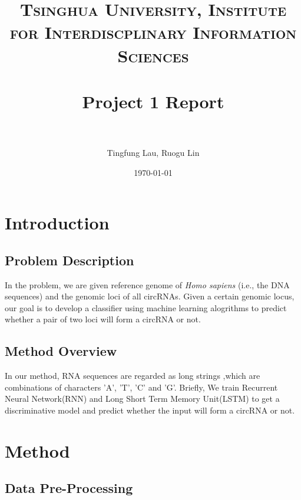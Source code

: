 \documentclass[paper=a4, fontsize=11pt] {scrartcl} %
\title{	
\normalfont \normalsize 
\textsc{Tsinghua University, Institute for Interdiscplinary Information Sciences} \\ [25pt] %
\horrule{0.5pt} \\[0.4cm] %
\huge Project 1 Report \\ %
\horrule{2pt} \\[0.5cm] %
}
\author{Tingfung Lau, Ruogu Lin} %
\date{\normalsize\today} %
\numberwithin{equation}{section} %
\numberwithin{figure}{section} %
\numberwithin{table}{section} %
\begin{document}
\maketitle %


\section{Introduction}


\subsection{Problem Description}

In the problem, we are given reference genome of \emph{Homo sapiens} (i.e., the DNA sequences) and the genomic loci of all circRNAs. Given a certain genomic locus, our goal is to develop a classifier using machine learning alogrithms to predict whether a pair of two loci will form a circRNA or not.\\

\subsection{Method Overview}
In our method, RNA sequences are regarded as long strings ,which are combinations of characters 'A', 'T', 'C' and 'G'. Briefly, We train Recurrent Neural Network(RNN) and Long Short Term Memory Unit(LSTM) to get a discriminative model and predict whether the input will form a circRNA or not.\\

\section{Method}



\subsection{Data Pre-Processing}
\end{document}
